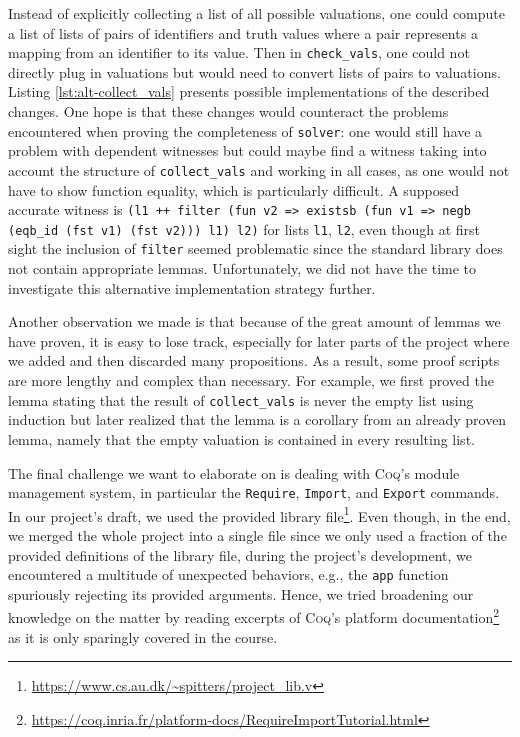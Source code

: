 Instead of explicitly collecting a list of all possible valuations, one could compute a list of lists of pairs of identifiers and truth values where a pair represents a mapping from an identifier to its value.
Then in \texttt{check\_vals}, one could not directly plug in valuations but would need to convert lists of pairs to valuations.
Listing \ref{lst:alt-collect_vals} presents possible implementations of the described changes.
One hope is that these changes would counteract the problems encountered when proving the completeness of \texttt{solver}: one would still have a problem with dependent witnesses but could maybe find a witness taking into account the structure of \texttt{collect\_vals} and working in all cases, as one would not have to show function equality, which is particularly difficult.
A supposed accurate witness is \texttt{(l1 ++ filter (fun v2 => existsb (fun v1 => negb (eqb\_id (fst v1) (fst v2))) l1) l2)} for lists \texttt{l1}, \texttt{l2}, even though at first sight the inclusion of \texttt{filter} seemed problematic since the standard library does not contain appropriate lemmas.
Unfortunately, we did not have the time to investigate this alternative implementation strategy further.

Another observation we made is that because of the great amount of lemmas we have proven, it is easy to lose track, especially for later parts of the project where we added and then discarded many propositions.
As a result, some proof scripts are more lengthy and complex than necessary.
For example, we first proved the lemma stating that the result of \texttt{collect\_vals} is never the empty list using induction but later realized that the lemma is a corollary from an already proven lemma, namely that the empty valuation is contained in every resulting list. 

The final challenge we want to elaborate on is dealing with \textsc{Coq}'s module management system, in particular the \texttt{Require}, \texttt{Import}, and \texttt{Export} commands.
In our project's draft, we used the provided library file\footnote{\url{https://www.cs.au.dk/~spitters/project_lib.v}}. 
Even though, in the end, we merged the whole project into a single file since we only used a fraction of the provided definitions of the library file, during the project's development, we encountered a multitude of unexpected behaviors, e.g., the \texttt{app} function spuriously rejecting its provided arguments.
Hence, we tried broadening our knowledge on the matter by reading excerpts of \textsc{Coq}'s platform documentation\footnote{\url{https://coq.inria.fr/platform-docs/RequireImportTutorial.html}} as it is only sparingly covered in the course. %
